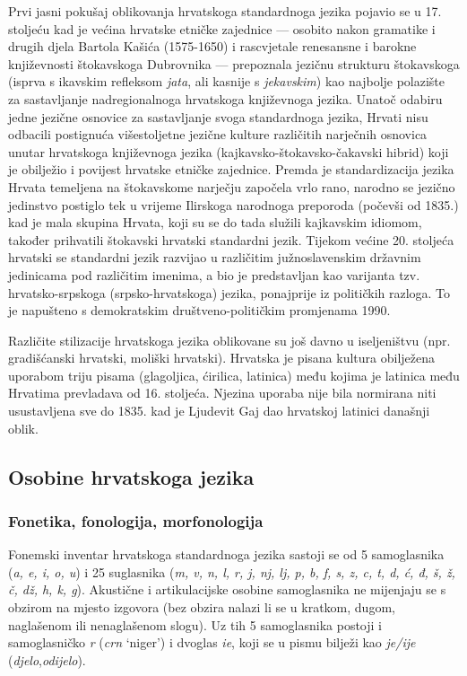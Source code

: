 \begin{multicols}{2}
Prvi jasni pokušaj oblikovanja hrvatskoga standardnoga jezika pojavio se u 17. stoljeću kad je većina hrvatske etničke zajednice — osobito nakon gramatike i drugih djela Bartola Kašića (1575-1650) i rascvjetale renesansne i barokne književnosti štokavskoga Dubrovnika — prepoznala jezičnu strukturu štokavskoga (isprva s ikavskim refleksom \emph{jata}, ali kasnije s \emph{jekavskim}) kao najbolje polazište za sastavljanje nadregionalnoga hrvatskoga književnoga jezika. Unatoč odabiru jedne jezične osnovice za sastavljanje svoga standardnoga jezika, Hrvati nisu odbacili postignuća višestoljetne jezične kulture različitih narječnih osnovica unutar hrvatskoga književnoga jezika (kajkavsko-štokavsko-čakavski hibrid) koji je obilježio i povijest hrvatske etničke zajednice. Premda je standardizacija jezika Hrvata temeljena na štokavskome narječju započela vrlo rano, narodno se jezično jedinstvo postiglo tek u vrijeme Ilirskoga narodnoga preporoda (počevši od 1835.) kad je mala skupina Hrvata, koji su se do tada služili kajkavskim idiomom, također prihvatili štokavski hrvatski standardni jezik. Tijekom većine 20. stoljeća hrvatski se standardni jezik razvijao u različitim južnoslavenskim državnim jedinicama pod različitim imenima, a bio je predstavljan kao varijanta tzv. hrvatsko-srpskoga (srpsko-hrvatskoga) jezika, ponajprije iz političkih razloga. To je napušteno s demokratskim društveno-političkim promjenama 1990.

Različite stilizacije hrvatskoga jezika oblikovane su još davno u iseljeništvu (npr. gradišćanski hrvatski, moliški hrvatski).
Hrvatska je pisana kultura obilježena uporabom triju pisama (glagoljica, ćirilica, latinica) među kojima je latinica među Hrvatima prevladava od 16. stoljeća. Njezina uporaba nije bila normirana niti usustavljena sve do 1835. kad je Ljudevit Gaj dao hrvatskoj latinici današnji oblik.

\subsection{Osobine hrvatskoga jezika}

\subsubsection{Fonetika, fonologija, morfonologija}

Fonemski inventar hrvatskoga standardnoga jezika sastoji se od 5 samoglasnika (\emph{a, e, i, o, u}) i 25 suglasnika (\emph{m, v, n, l, r, j, nj, lj, p, b, f, s, z, c, t, d, ć, đ, š, ž, č, dž, h, k, g}). Akustične i artikulacijske osobine samoglasnika ne mijenjaju se s obzirom na mjesto izgovora (bez obzira nalazi li se u kratkom, dugom, naglašenom ili nenaglašenom slogu). Uz tih 5 samoglasnika postoji i samoglasničko \emph{r} (\emph{crn} ‘niger’) i dvoglas \emph{ie}, koji se u pismu bilježi kao \emph{je/ije} (\emph{djelo},\emph{odijelo}).


\end{multicols}

